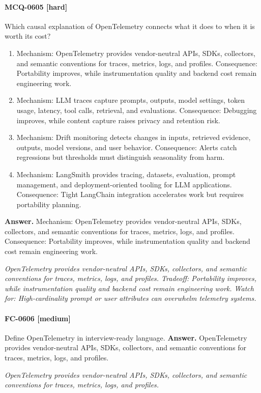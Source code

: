 \paragraph{MCQ-0605 [hard]} Which causal explanation of OpenTelemetry connects what it does to when it is worth its cost?
\begin{enumerate}[label=\Alph*.]
\item Mechanism: OpenTelemetry provides vendor-neutral APIs, SDKs, collectors, and semantic conventions for traces, metrics, logs, and profiles. Consequence: Portability improves, while instrumentation quality and backend cost remain engineering work.
\item Mechanism: LLM traces capture prompts, outputs, model settings, token usage, latency, tool calls, retrieval, and evaluations. Consequence: Debugging improves, while content capture raises privacy and retention risk.
\item Mechanism: Drift monitoring detects changes in inputs, retrieved evidence, outputs, model versions, and user behavior. Consequence: Alerts catch regressions but thresholds must distinguish seasonality from harm.
\item Mechanism: LangSmith provides tracing, datasets, evaluation, prompt management, and deployment-oriented tooling for LLM applications. Consequence: Tight LangChain integration accelerates work but requires portability planning.
\end{enumerate}
\noindent\textbf{Answer.} Mechanism: OpenTelemetry provides vendor-neutral APIs, SDKs, collectors, and semantic conventions for traces, metrics, logs, and profiles. Consequence: Portability improves, while instrumentation quality and backend cost remain engineering work.
\par\textit{OpenTelemetry provides vendor-neutral APIs, SDKs, collectors, and semantic conventions for traces, metrics, logs, and profiles. Tradeoff: Portability improves, while instrumentation quality and backend cost remain engineering work. Watch for: High-cardinality prompt or user attributes can overwhelm telemetry systems.}
\paragraph{FC-0606 [medium]} Define OpenTelemetry in interview-ready language.
\noindent\textbf{Answer.} OpenTelemetry provides vendor-neutral APIs, SDKs, collectors, and semantic conventions for traces, metrics, logs, and profiles.
\par\textit{OpenTelemetry provides vendor-neutral APIs, SDKs, collectors, and semantic conventions for traces, metrics, logs, and profiles.}
